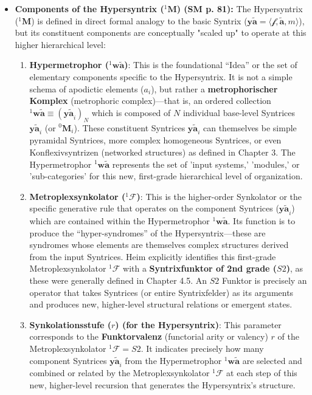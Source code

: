 \documentclass[12pt]{article}
\newcommand{\q}[1]{\enquote{#1}}
\newcommand{\syntrix}{\bm{y\widetilde{a}}}
\newcommand{\metrophor}{\bm{\widetilde{a}}}
\newcommand{\synkolator}{\mathcal{f}}
\newcommand{\synkolationsstufe}{m}
\newcommand{\metroplex}[1]{{}^{#1}\mathbf{M}}
\newcommand{\hypersyntrix}{\metroplex{1}}
\newcommand{\hypermetrophor}[1]{{}^{#1}\mathbf{w\widetilde{a}}}
\newcommand{\metroplexsynkolator}[1]{{}^{#1}\mathcal{F}}
\begin{document}
\begin{itemize}
    \item \textbf{Components of the Hypersyntrix (\(\hypersyntrix\)) (SM p. 81):}
    The Hypersyntrix (\(\hypersyntrix\)) is defined in direct formal analogy to the basic Syntrix (\( \syntrix = \langle \synkolator, \metrophor, \synkolationsstufe \rangle \)), but its constituent components are conceptually "scaled up" to operate at this higher hierarchical level:
    \begin{enumerate}
        \item \textbf{Hypermetrophor (\( \hypermetrophor{1} \))}: This is the foundational \q{Idea} or the set of elementary components specific to the Hypersyntrix. It is not a simple schema of apodictic elements (\(a_i\)), but rather a \textbf{metrophorischer Komplex} (metrophoric complex)—that is, an ordered collection \( \hypermetrophor{1} \equiv (\syntrix_i)_N \) which is composed of \( N \) individual base-level Syntrices \( \syntrix_i \) (or \(\metroplex{0}_i\)). These constituent Syntrices \( \syntrix_i \) can themselves be simple pyramidal Syntrices, more complex homogeneous Syntrices, or even Konflexivsyntrizen (networked structures) as defined in Chapter 3. The Hypermetrophor \( \hypermetrophor{1} \) represents the set of 'input systems,' 'modules,' or 'sub-categories' for this new, first-grade hierarchical level of organization.
        \item \textbf{Metroplexsynkolator (\( \metroplexsynkolator{1} \))}: This is the higher-order Synkolator or the specific generative rule that operates on the component Syntrices (\(\syntrix_i\)) which are contained within the Hypermetrophor \( \hypermetrophor{1} \). Its function is to produce the \q{hyper-syndromes} of the Hypersyntrix—these are syndromes whose elements are themselves complex structures derived from the input Syntrices. Heim explicitly identifies this first-grade Metroplexsynkolator \( \metroplexsynkolator{1} \) with a \textbf{Syntrixfunktor of 2nd grade (\( S2 \))}, as these were generally defined in Chapter 4.5. An \( S2 \) Funktor is precisely an operator that takes Syntrices (or entire Syntrixfelder) as its arguments and produces new, higher-level structural relations or emergent states.
        \item \textbf{Synkolationsstufe (\( r \)) (for the Hypersyntrix)}: This parameter corresponds to the \textbf{Funktorvalenz} (functorial arity or valency) \( r \) of the Metroplexsynkolator \( \metroplexsynkolator{1} = S2 \). It indicates precisely how many component Syntrices \( \syntrix_i \) from the Hypermetrophor \( \hypermetrophor{1} \) are selected and combined or related by the Metroplexsynkolator \( \metroplexsynkolator{1} \) at each step of this new, higher-level recursion that generates the Hypersyntrix's structure.
    \end{enumerate}


\end{itemize}
\end{document}
